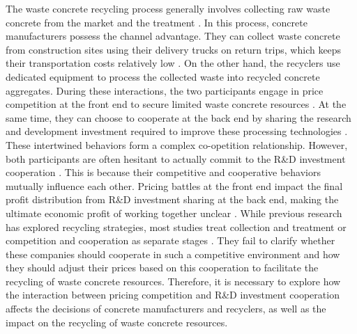 \documentclass[authoryear,preprint,review,times,10pt]{elsarticle}
\begin{document}
The waste concrete recycling process generally involves collecting raw waste concrete from the market and the treatment \citep{he2020Investigation}. In this process, concrete manufacturers possess the channel advantage. They can collect waste concrete from construction sites using their delivery trucks on return trips, which keeps their transportation costs relatively low \citep{besklubova2026Establishing}. On the other hand, the recyclers use dedicated equipment to process the collected waste into recycled concrete aggregates\citep{chen2025Exploring}. During these interactions, the two participants engage in price competition at the front end to secure limited waste concrete resources \citep{he2020Investigation}. At the same time, they can choose to cooperate at the back end by sharing the research and development investment required to improve these processing technologies \citep{liu2019Expand}. These intertwined behaviors form a complex co-opetition relationship. However, both participants are often hesitant to actually commit to the R\&D investment cooperation \citep{bao2020Developing}. This is because their competitive and cooperative behaviors mutually influence each other. Pricing battles at the front end impact the final profit distribution from R\&D investment sharing at the back end, making the ultimate economic profit of working together unclear \citep{li2020Key}. While previous research has explored recycling strategies, most studies treat collection and treatment or competition and cooperation as separate stages \citep{hu2021Dynamic,yuan2023Differentiated}. They fail to clarify whether these companies should cooperate in such a competitive environment and how they should adjust their prices based on this cooperation to facilitate the recycling of waste concrete resources. Therefore, it is necessary to explore how the interaction between pricing competition and R\&D investment cooperation affects the decisions of concrete manufacturers and recyclers, as well as the impact on the recycling of waste concrete resources.
\end{document}
